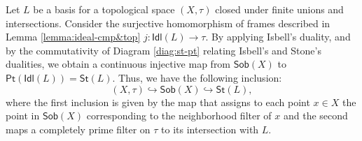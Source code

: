 \documentclass{article}
\theoremstyle{plain}
\theoremstyle{definition}
\theoremstyle{remark}
\newcommand{\bool}[1]{\mathsf{#1}}
\newcommand{\0}{\mathbbm 0}
\newcommand{\1}{\mathbbm 1}
\newcommand{\2}{\mathbbm 2}
\begin{document}
Let \(L\) be a basis for a topological space \((X,\tau)\) closed under finite unions and intersections. Consider the surjective homomorphism of frames described in Lemma \ref{lemma:ideal-cmp&top}
\(
j: \bool{Idl}(L) \to \tau.
\)  
By applying Isbell’s duality, and by the commutativity of Diagram \ref{diag:st-pt} relating Isbell's and Stone's dualities, we obtain a continuous injective map from  
\(\bool{Sob}(X)\) to \(\bool{Pt}(\bool{Idl}(L)) = \bool{St}(L)\).  
Thus, we have the following inclusion:  
\begin{equation}
\label{eqn:subspaces}
    (X,\tau) \hookrightarrow \bool{Sob}(X) \hookrightarrow \bool{St}(L),
\end{equation}
where the first inclusion is given by the map that assigns to each point \(x \in X\) the point in \(\bool{Sob}(X)\) corresponding to the neighborhood filter of \(x\) and the second maps a completely prime filter on $\tau$ to its intersection with $L$. 
\end{document}
